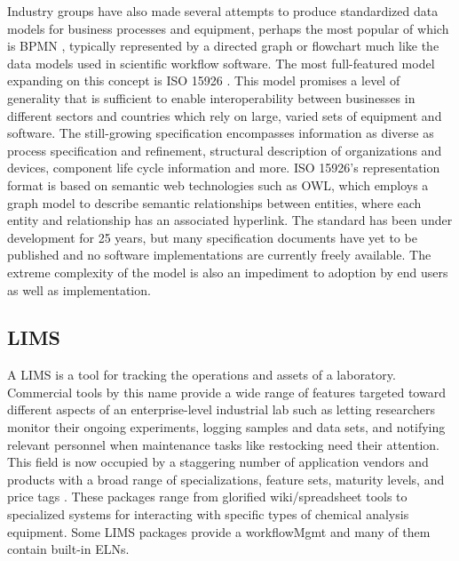 \documentclass[../thesis]{subfiles}
\begin{document}
Industry groups have also made several attempts to produce
standardized data models for business processes and equipment, perhaps
the most popular of which is \gls{BPMN}
\cite{Allweyer:2010:BPM:1841147}, typically represented by a directed
graph or flowchart much like the data models used in scientific
workflow software. The
most full-featured model expanding on this concept is ISO 15926
\cite{West2009}. This model promises
a level of generality that is sufficient to enable interoperability
between businesses in different sectors and countries which rely on
large, varied sets of equipment and software. The still-growing
specification encompasses information as diverse as process
specification and refinement, structural description of organizations
and devices, component life cycle information and more. ISO 15926's
representation format is based on semantic web technologies such as OWL, which
employs a graph model to describe semantic relationships between
entities, where each entity and relationship has an associated
hyperlink. The standard has been under development for 25 years, but
many specification documents have yet to be published and no software
implementations are currently freely available. The extreme complexity
of the model is also an impediment to adoption by end users as well as
implementation.

\subsection{\Gls{LIMS}}
A \gls{LIMS} is a tool for tracking the operations and assets
of a laboratory. Commercial tools by this name provide a wide range
of features targeted toward different aspects of an enterprise-level
industrial lab such as letting researchers monitor their ongoing
experiments, logging samples and data sets, and notifying relevant
personnel when maintenance tasks like restocking need their
attention. This field is now occupied by a staggering number of
application vendors and products with a broad range of
specializations, feature sets, maturity levels, and price tags
\cite{LIMSWikiList}. These packages range from glorified
wiki/spreadsheet tools to specialized systems for interacting with
specific types of chemical analysis equipment.
Some \gls{LIMS} packages provide a \gls{workflowMgmt}
and many of them contain built-in \gls{ELN}s.
\end{document}

